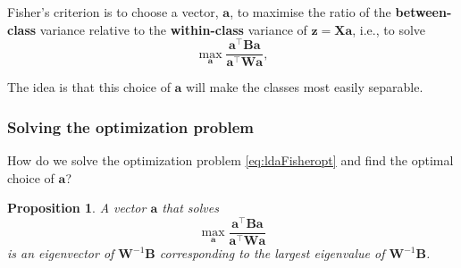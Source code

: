 \documentclass[
]{book}
\newtheorem{proposition}{Proposition}[chapter]
\theoremstyle{definition}
\theoremstyle{definition}
\theoremstyle{definition}
\theoremstyle{definition}
\theoremstyle{remark}
\begin{document}
Fisher's criterion is to choose a vector, \(\mathbf a\), to maximise the ratio of the \textbf{between-class} variance relative to the \textbf{within-class} variance of \(\mathbf z=\mathbf X\mathbf a\), i.e., to solve
\begin{equation}
\max_{\mathbf a}\frac{\mathbf a^\top \mathbf B\mathbf a}{\mathbf a^\top \mathbf W\mathbf a}, \label{eq:ldaFisheropt}
\end{equation}

The idea is that this choice of \(\mathbf a\) will make the classes most easily separable.

\subsubsection*{Solving the optimization problem}\label{solving-the-optimization-problem}

How do we solve the optimization problem \eqref{eq:ldaFisheropt} and find the optimal choice of \(\mathbf a\)?

\begin{proposition}
\protect\hypertarget{prp:nine2}{}\label{prp:nine2}A vector \(\mathbf a\) that solves \[\max_{\mathbf a}\frac{\mathbf a^\top \mathbf B\mathbf a}{\mathbf a^\top \mathbf W\mathbf a}\] is an eigenvector of \(\mathbf W^{-1}\mathbf B\) corresponding to the largest eigenvalue of \(\mathbf W^{-1}\mathbf B\).
\end{proposition}
\end{document}
